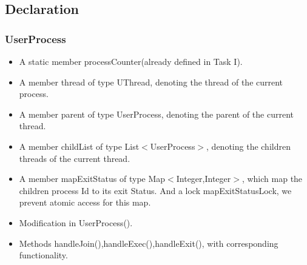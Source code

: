 \documentclass{article}
\begin{document}
	\subsection{Declaration}
	\subsubsection*{UserProcess}
	\begin{itemize}
		\item A static member processCounter(already defined in Task I).
		\item A member thread of type UThread, denoting the thread of the current process.
		\item A member parent of type UserProcess, denoting the parent of the current thread.
		\item A member childList of type List$<$UserProcess$>$, denoting the children threads of the current thread.
		\item A member mapExitStatus of type Map$<$Integer,Integer$>$, which map the children process Id to its exit Status. And a lock mapExitStatusLock, we prevent atomic access for this map.
		
		\item Modification in UserProcess().
		
		\item Methods handleJoin(),handleExec(),handleExit(), with corresponding functionality.
	\end{itemize}
\end{document}
